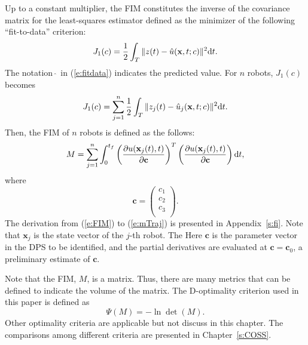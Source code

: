      Up to a constant multiplier, the FIM constitutes the inverse of the covariance matrix for the least-squares estimator defined as the minimizer of the following  ``fit-to-data'' criterion:
    \begin{equation}\label{e:fitdata}
    J_1(c) = \frac{1}{2} \int_T \| z(t) - \hat u(\mathbf{x},t;c)\|^2 \hbox{d}t.
    \end{equation}
    The notation $\hat \;$ in (\ref{e:fitdata}) indicates the predicted value.
For $n$ robots, $J_1(c)$ becomes
    \begin{equation*}\label{e:fitdataN}
    J_1(c) = \sum_{j=1}^n \frac{1}{2} \int_T \| z_j(t) - \hat u_j(\mathbf{x},t;c)\|^2 \hbox{d}t.
    \end{equation*}
Then, the FIM of $n$ robots is defined as the follows:
    \begin{equation}\label{e:mTraj}
        M= \sum_{j=1}^n \int_0^{t_f}
        \left( \frac{\partial u(\mathbf{x}_j(t), t)}{\partial \mathbf{c}} \right)^T
        \left( \frac{\partial u(\mathbf{x}_j(t), t)}{\partial \mathbf{c}} \right) \hbox{d}t,
    \end{equation}
    where
    $$\mathbf{c}=\left(
                   \begin{array}{c}
                     c_1 \\
                     c_2 \\
                     c_3 \\
                   \end{array}
                 \right)
     .$$
    The derivation from (\ref{e:FIM}) to (\ref{e:mTraj}) is presented in Appendix~\ref{s:fi}.
    Note that  $\mathbf{x}_j$ is the state vector of the $j$-th robot. The Here $\mathbf{c}$ is the parameter vector in the DPS to be identified, and the partial derivatives are evaluated at $\mathbf{c} = \mathbf{c}_0$, a preliminary estimate of $\mathbf{c}$.

Note that the FIM, $M$, is a matrix. Thus, there are many metrics that can be defined to indicate the volume of the matrix.   The D-optimality criterion used in this paper is defined as
\begin{equation*}\label{e:dopt}
\Psi(M) = -\ln \det(M).
\end{equation*}
Other optimality criteria are applicable but not discuss in this chapter. The comparisons among different criteria are presented in Chapter~\ref{s:COSS}.


